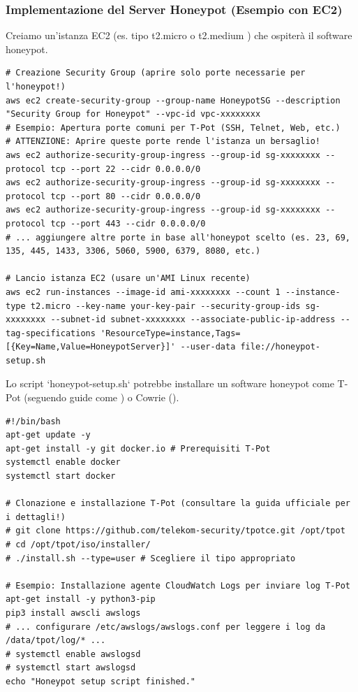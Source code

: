 \documentclass[a4paper,12pt]{report}
\begin{document}
\subsubsection{Implementazione del Server Honeypot (Esempio con EC2)}
\label{subsubsec:impl_server}

Creiamo un'istanza EC2 (es. tipo t2.micro o t2.medium \cite{aws_t2}) che ospiterà il software honeypot.

\begin{lstlisting}[caption={Configurazione (esemplificativa) del server honeypot EC2}, label=lst:ec2_setup]
# Creazione Security Group (aprire solo porte necessarie per l'honeypot!)
aws ec2 create-security-group --group-name HoneypotSG --description "Security Group for Honeypot" --vpc-id vpc-xxxxxxxx
# Esempio: Apertura porte comuni per T-Pot (SSH, Telnet, Web, etc.)
# ATTENZIONE: Aprire queste porte rende l'istanza un bersaglio!
aws ec2 authorize-security-group-ingress --group-id sg-xxxxxxxx --protocol tcp --port 22 --cidr 0.0.0.0/0
aws ec2 authorize-security-group-ingress --group-id sg-xxxxxxxx --protocol tcp --port 80 --cidr 0.0.0.0/0
aws ec2 authorize-security-group-ingress --group-id sg-xxxxxxxx --protocol tcp --port 443 --cidr 0.0.0.0/0
# ... aggiungere altre porte in base all'honeypot scelto (es. 23, 69, 135, 445, 1433, 3306, 5060, 5900, 6379, 8080, etc.)

# Lancio istanza EC2 (usare un'AMI Linux recente)
aws ec2 run-instances --image-id ami-xxxxxxxx --count 1 --instance-type t2.micro --key-name your-key-pair --security-group-ids sg-xxxxxxxx --subnet-id subnet-xxxxxxxx --associate-public-ip-address --tag-specifications 'ResourceType=instance,Tags=[{Key=Name,Value=HoneypotServer}]' --user-data file://honeypot-setup.sh
\end{lstlisting}

Lo script `honeypot-setup.sh` potrebbe installare un software honeypot come T-Pot (seguendo guide come \cite{zhang_2023}) o Cowrie (\cite{cowrie_aws, infosanity_2020}).

\begin{lstlisting}[caption={Script di esempio `honeypot-setup.sh` per installare T-Pot (semplificato)}, label=lst:tpot_setup]
#!/bin/bash
apt-get update -y
apt-get install -y git docker.io # Prerequisiti T-Pot
systemctl enable docker
systemctl start docker

# Clonazione e installazione T-Pot (consultare la guida ufficiale per i dettagli!)
# git clone https://github.com/telekom-security/tpotce.git /opt/tpot
# cd /opt/tpot/iso/installer/
# ./install.sh --type=user # Scegliere il tipo appropriato

# Esempio: Installazione agente CloudWatch Logs per inviare log T-Pot
apt-get install -y python3-pip
pip3 install awscli awslogs
# ... configurare /etc/awslogs/awslogs.conf per leggere i log da /data/tpot/log/* ...
# systemctl enable awslogsd
# systemctl start awslogsd
echo "Honeypot setup script finished."
\end{lstlisting}
\end{document}
